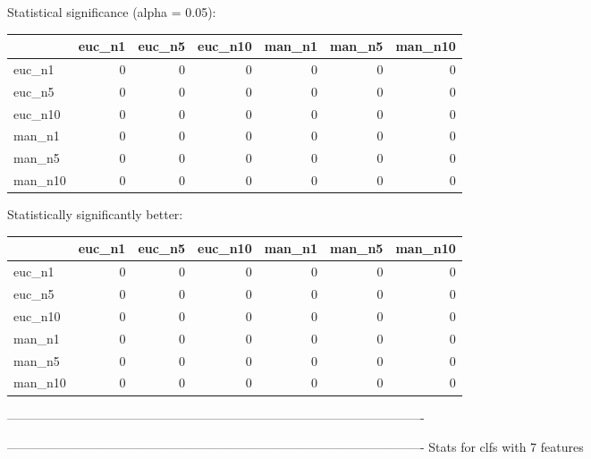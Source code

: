 Statistical significance (alpha = 0.05):
 \begin{tabular}{lrrrrrr}
\hline
         &   euc\_n1 &   euc\_n5 &   euc\_n10 &   man\_n1 &   man\_n5 &   man\_n10 \\
\hline
 euc\_n1  &        0 &        0 &         0 &        0 &        0 &         0 \\
 euc\_n5  &        0 &        0 &         0 &        0 &        0 &         0 \\
 euc\_n10 &        0 &        0 &         0 &        0 &        0 &         0 \\
 man\_n1  &        0 &        0 &         0 &        0 &        0 &         0 \\
 man\_n5  &        0 &        0 &         0 &        0 &        0 &         0 \\
 man\_n10 &        0 &        0 &         0 &        0 &        0 &         0 \\
\hline
\end{tabular} 

Statistically significantly better:
 \begin{tabular}{lrrrrrr}
\hline
         &   euc\_n1 &   euc\_n5 &   euc\_n10 &   man\_n1 &   man\_n5 &   man\_n10 \\
\hline
 euc\_n1  &        0 &        0 &         0 &        0 &        0 &         0 \\
 euc\_n5  &        0 &        0 &         0 &        0 &        0 &         0 \\
 euc\_n10 &        0 &        0 &         0 &        0 &        0 &         0 \\
 man\_n1  &        0 &        0 &         0 &        0 &        0 &         0 \\
 man\_n5  &        0 &        0 &         0 &        0 &        0 &         0 \\
 man\_n10 &        0 &        0 &         0 &        0 &        0 &         0 \\
\hline
\end{tabular} 

----------------------------------------------------------------------------------------------------



----------------------------------------------------------------------------------------------------
Stats for clfs with 7 features


